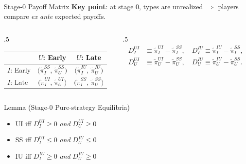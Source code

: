 \documentclass[aspectratio=169, 12pt]{beamer}
\begin{document}
\begin{frame}{Stage-0 Payoff Matrix}
  \textbf{Key point}: at stage 0, types are unrealized $\Rightarrow$
  players compare \emph{ex ante} expected payoffs.

  \begin{columns}
    \begin{column}{.5\textwidth}
      \begin{center}
        \renewcommand{\arraystretch}{1.0}
        \begin{tabular}{@{}lcc@{}}
          \toprule
          & $U$: Early & $U$: Late \\
          \midrule
          $I$: Early
            & $\bigl(\widetilde\pi_I^{SS},\, \widetilde\pi_U^{SS}\bigr)$
            & $\bigl(\widetilde\pi_I^{IU},\, \widetilde\pi_U^{IU}\bigr)$ \\
          $I$: Late
            & $\bigl(\widetilde\pi_I^{UI},\, \widetilde\pi_U^{UI}\bigr)$
            & $\bigl(\widetilde\pi_I^{SS},\, \widetilde\pi_U^{SS}\bigr)$ \\
          \bottomrule
        \end{tabular}
      \end{center}
    \end{column}

    \begin{column}{.5\textwidth}
        \footnotesize
        \begin{align*}
          D_I^{UI} &\equiv \widetilde\pi_I^{UI} - \widetilde\pi_I^{SS}, \quad
          D_I^{IU} \equiv \widetilde\pi_I^{IU} - \widetilde\pi_I^{SS}, \\
          D_U^{UI} &\equiv \widetilde\pi_U^{UI} - \widetilde\pi_U^{SS}, \quad
          D_U^{IU} \equiv \widetilde\pi_U^{IU} - \widetilde\pi_U^{SS}.
        \end{align*}
    \end{column}
  \end{columns}

  \begin{block}{Lemma (Stage-0 Pure-strategy Equilibria)}
    \begin{itemize}\setlength{\itemsep}{0.1em}
      \item UI \; iff \; $D_I^{UI} \ge 0$ \emph{and} $D_U^{UI} \ge 0$
      \item SS \; iff \; $D_I^{UI} \le 0$ \emph{and} $D_U^{IU} \le 0$
      \item IU \; iff \; $D_I^{IU} \ge 0$ \emph{and} $D_U^{IU} \ge 0$
    \end{itemize}
  \end{block}
\end{frame}
\end{document}
